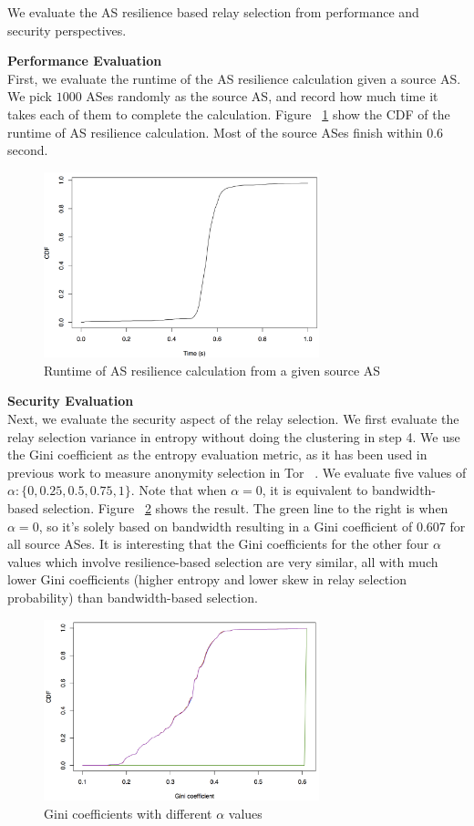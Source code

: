 We evaluate the AS resilience based relay selection from performance and security perspectives. 

\textbf{Performance Evaluation}\\
First, we evaluate the runtime of the AS resilience calculation given a source AS. We pick $1000$ ASes randomly as the source AS, and record how much time it takes each of them to complete the calculation. Figure ~\ref{fig_ascal} show the CDF of the runtime of AS resilience calculation. Most of the source ASes finish within $0.6$ second. 

\begin{figure}[ht!]
\centering
\includegraphics[width=80mm]{figure/runtime}
\caption{Runtime of AS resilience calculation from a given source AS \label{fig_ascal}}
\end{figure}

\textbf{Security Evaluation}\\
Next, we evaluate the security aspect of the relay selection. We first evaluate the relay selection variance in entropy without doing the clustering in step 4. We use the Gini coefficient as the entropy evaluation metric, as it has been used in previous work to measure anonymity selection in Tor ~\cite{akhoondi2012lastor}. We evaluate five values of $\alpha: \{0, 0.25, 0.5, 0.75, 1\}$. Note that when $\alpha = 0$, it is equivalent to bandwidth-based selection. Figure ~\ref{fig_gini} shows the result. The green line to the right is when $\alpha = 0$, so it's solely based on bandwidth resulting in a Gini coefficient of $0.607$ for all source ASes. It is interesting that the Gini coefficients for the other four $\alpha$ values which involve resilience-based selection are very similar, all with much lower Gini coefficients (higher entropy and lower skew in relay selection probability) than bandwidth-based selection. 

\begin{figure}[ht!]
\centering
\includegraphics[width=80mm]{figure/gini}
\caption{Gini coefficients with different $\alpha$ values \label{fig_gini}}
\end{figure}




